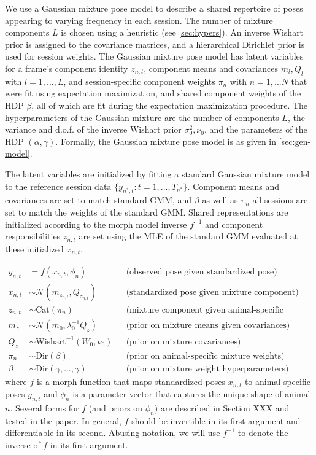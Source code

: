 \documentclass{article}         %
\newcommand{\inv}{^{-1}}
\newcommand{\NN}{\mathcal{N}}
\begin{document}
We use a Gaussian mixture pose model to describe a shared repertoire of poses appearing to varying frequency in each session. The number of mixture components $L$ is chosen using a heuristic (see \ref{sec:hypers}). An inverse Wishart prior is assigned to the covariance matrices, and a hierarchical Dirichlet prior is used for session weights. The Gaussian mixture pose model has latent variables for a frame's component identity $z_{n, t}$, component means and covariances $m_l, Q_l$ with $l=1,...,L$, and session-specific component weights $\pi_n$ with $n=1,...N$ that were fit using expectation maximization, and shared component weights of the HDP $\beta$, all of which are fit during the expectation maximization procedure. The hyperparameters of the Gaussian mixture are the number of components $L$, the variance and d.o.f. of the inverse Wishart prior $\sigma_0^2, \nu_0$, and the parameters of the HDP $(\alpha, \gamma)$. Formally, the Gaussian mixture pose model is as given in \ref{sec:gen-model}.

The latent variables are initialized by fitting a standard Gaussian mixture model to the reference session data $\{y_{n^{*}, t}:t=1,...,T_{n^*}\}$. Component means and covariances are set to match standard GMM, and $\beta$ as well as $\pi_{n}$ all sessions are set to match the weights of the standard GMM. Shared representations are initialized according to the morph model inverse $f\inv$ and component responsibilities $z_{n, t}$ are set using the MLE of the standard GMM evaluated at these initialized $x_{n, t}$.




%
\begin{align*}
    y_{n,t} & = f(x_{n,t}, \phi_n) 
        && \text{(observed pose given standardized pose)} \\
    x_{n,t} & \sim \NN(m_{z_{n,t}}, Q_{z_{n,t}}) 
        && \text{(standardized pose given mixture component)}  \\
    z_{n,t} & \sim \text{Cat}(\pi_n)  
        && \text{(mixture component given animal-specific weights)} \\
    m_z & \sim \NN(m_0, \lambda_0^{-1} Q_z) 
        && \text{(prior on mixture means given covariances)} \\
    Q_z & \sim \text{Wishart}^{-1}(W_0, \nu_0) 
        && \text{(prior on mixture covariances)} \\
    \pi_n & \sim \text{Dir}(\beta)
        && \text{(prior on animal-specific mixture weights)} \\
    \beta & \sim \text{Dir}(\gamma,\dots,\gamma)
        && \text{(prior on mixture weight hyperparameters)}
\end{align*}   
%
where $f$ is a morph function that maps standardized poses $x_{n,t}$ to animal-specific poses $y_{n,t}$ and $\phi_n$ is a parameter vector that captures the unique shape of animal $n$. Several forms for $f$ (and priors on $\phi_n$) are described in Section XXX and tested in the paper. In general, $f$ should be invertible in its first argument and differentiable in its second. Abusing notation, we will use $f^{-1}$ to denote the inverse of $f$ in its first argument.
\end{document}
